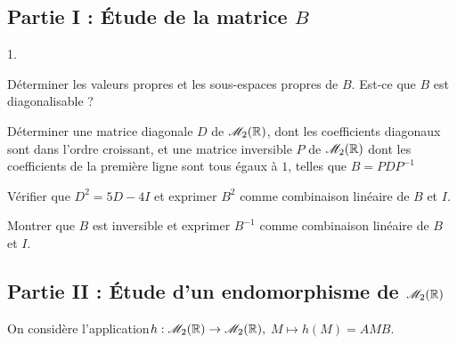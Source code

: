 \documentclass[11pt]{article}%
\begin{document}
\subsection*{Partie I : Étude de la matrice $B$}

\begin{noliste}{1.}
 \setlength{\itemsep}{4mm}
\item Déterminer les valeurs propres et les sous-espaces propres de
$B$.
Est-ce que $B$ est diagonalisable ?

\item Déterminer une matrice diagonale $D$ de $\mathscr{M}_{2}(\mathbb{R}) $, dont les
coefficients diagonaux sont dans l'ordre
croissant, et une matrice inversible $P$ de $\mathscr{M}_{2}(\mathbb{R}) $ dont les
coefficients de la première ligne sont tous
égaux à $1$, telles que $B = PDP^{-1}$

\item Vérifier que $D^{2} = 5D-4I$ et exprimer $B^{2}$ comme
combinaison
linéaire de $B$ et $I$.

\item Montrer que $B$ est inversible et exprimer $B^{-1}$ comme
combinaison
linéaire de $B$ et $I$.
\end{noliste}

\subsection*{Partie II : Étude d'un endomorphisme de $\mathscr{M}_{2}(\mathbb{R}) $}

On considère l'application\qquad$h :\mathscr{M}_{2}(\mathbb{R}) \rightarrow\mathscr{M}_{2}(\mathbb{R}),$
\quad$M\longmapsto h\left( M\right) = AMB$.
\end{document}
